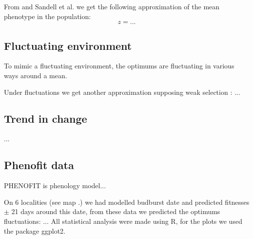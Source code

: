 From \citep{engen_evolution_2011} and Sandell et al. we get the following approximation of the mean phenotype in the population:
\begin{equation}
	z = ...
\end{equation}

\subsection*{Fluctuating environment}

To mimic a fluctuating environment, the optimums are fluctuating in various ways around a mean.

Under fluctuations we get another approximation supposing weak selection \citep{engen_evolution_2011}:
...

\subsection*{Trend in change}
...

\subsection*{Phenofit data}

PHENOFIT is phenology model...

On 6 localities (see map .) we had modelled budburst date and predicted fitnesses $\pm$ 21 days around this date, from these data we predicted the optimums fluctuations:
...
All statistical analysis were made using R, for the plots we used the package ggplot2.

